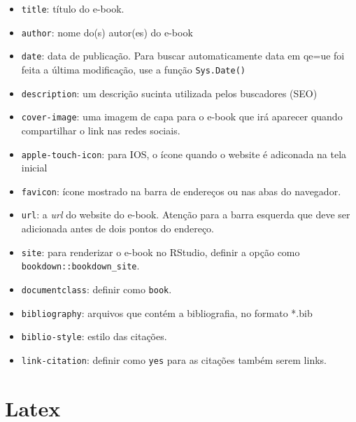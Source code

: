 \documentclass[
]{book}
\providecommand{\tightlist}{%
  \setlength{\itemsep}{0pt}\setlength{\parskip}{0pt}}
\begin{document}
\begin{itemize}
\tightlist
\item
  \texttt{title}: título do e-book.
\item
  \texttt{author}: nome do(s) autor(es) do e-book
\item
  \texttt{date}: data de publicação. Para buscar automaticamente data em qe=ue foi feita a última modificação, use a função \texttt{Sys.Date()}
\item
  \texttt{description}: um descrição sucinta utilizada pelos buscadores (SEO)
\item
  \texttt{cover-image}: uma imagem de capa para o e-book que irá aparecer quando compartilhar o link nas redes sociais.
\item
  \texttt{apple-touch-icon}: para IOS, o ícone quando o website é adiconada na tela inicial
\item
  \texttt{favicon}: ícone mostrado na barra de endereços ou nas abas do navegador.
\item
  \texttt{url}: a \emph{url} do website do e-book. Atenção para a barra esquerda que deve ser adicionada antes de dois pontos do endereço.
\item
  \texttt{site}: para renderizar o e-book no RStudio, definir a opção como \texttt{bookdown::bookdown\_site}.
\item
  \texttt{documentclass}: definir como \texttt{book}.
\item
  \texttt{bibliography}: arquivos que contém a bibliografia, no formato *.bib
\item
  \texttt{biblio-style}: estilo das citações.
\item
  \texttt{link-citation}: definir como \texttt{yes} para as citações também serem links.
\end{itemize}

\hypertarget{latex}{%
\chapter{Latex}\label{latex}}
\end{document}
